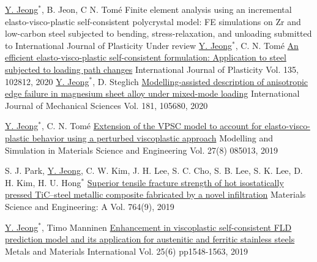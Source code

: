 
\begin{cventries}
  \cventry
  {\underline{Y. Jeong}$^*$, B. Jeon, C N. Tom\'{e}}
  {Finite element analysis using an incremental elasto-visco-plastic self-consistent polycrystal model: FE simulations on Zr and low-carbon steel subjected to bending, stress-relaxation, and unloading}
  {submitted to International Journal of Plasticity}
  {Under review}
  {
  }
  \cventry
  {\underline{Y. Jeong}$^*$, C. N. Tom\'{e}}
  {\href{https://doi.org/10.1016/j.ijplas.2020.102812}{An efficient elasto-visco-plastic self-consistent formulation: Application to steel subjected to loading path changes}}
  {International Journal of Plasticity}
  {Vol. 135, 102812, 2020}
  {
  }
  \cventry
  {\underline{Y. Jeong}$^*$, D. Steglich}
  {\href{https://doi.org/10.1016/j.ijmecsci.2020.105680}{Modelling-assisted description of anisotropic edge failure in magnesium sheet alloy under mixed-mode loading}}
  {International Journal of Mechanical Sciences}
  {Vol. 181, 105680, 2020}
  {
  }

  \cventry
  {\underline{Y. Jeong}$^*$, C. N. Tom\'{e}}
  {\href{https://doi.org/10.1088/1361-651X/ab4b66}{Extension of the VPSC model to account for elasto-visco-plastic behavior using a perturbed viscoplastic approach}}
  {Modelling and Simulation in Materials Science and Engineering}
  {Vol. 27(8) 085013, 2019}
  {
  }

  \cventry
  {S. J. Park, \underline{Y. Jeong}, C. W. Kim, J. H. Lee, S. C. Cho, S. B. Lee, S. K. Lee, D. H. Kim, H. U. Hong$^*$}
  {\href{https://doi.org/10.1016/j.msea.2019.138260}{Superior tensile fracture strength of hot isostatically pressed TiC–steel metallic composite fabricated by a novel infiltration}}
  {Materials Science and Engineering: A}
  {Vol. 764(9), 2019}
  {
  }

  \cventry
  {\underline{Y. Jeong}$^*$, Timo Manninen}
  {\href{https://doi.org/10.1007/s12540-019-00292-5}{Enhancement in viscoplastic self-consistent FLD prediction model and its application for austenitic and ferritic stainless steels}}
  {Metals and Materials International}
  {Vol. 25(6) pp1548-1563, 2019}
  {
  }


\end{cventries}
